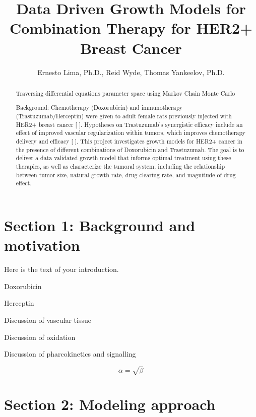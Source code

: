 \documentclass{article}
\begin{document}
\title{Data Driven Growth Models for Combination Therapy for HER2+ Breast Cancer}
\author{Ernesto Lima, Ph.D., Reid Wyde, Thomas Yankeelov, Ph.D.}

\maketitle

\begin{abstract}
Traversing differential equations parameter space using Markov Chain Monte Carlo

Background: Chemotherapy (Doxorubicin) and immunotherapy (Trastuzumab/Herceptin) were given to adult female rats previously injected with HER2+ breast cancer [ ]. Hypotheses on Trastuzumab's synergistic efficacy include an effect of improved vascular regularization within tumors, which improves chemotherapy delivery and efficacy [ ]. This project investigates growth models for HER2+ cancer in the presence of different combinations of Doxorubicin and Trastuzumab. The goal is to deliver a data validated growth model that informs optimal treatment using these therapies, as well as characterize the tumoral system, including the relationship between tumor size, natural growth rate, drug clearing rate, and magnitude of drug effect.

\end{abstract}

\section{Section 1: Background and motivation}
Here is the text of your introduction.

Doxorubicin


Herceptin


Discussion of vascular tissue

Discussion of oxidation

Discussion of pharcokinetics and signalling




\begin{equation}
    \label{simple_equation}
    \alpha = \sqrt{ \beta }
\end{equation}



\section{Section 2: Modeling approach}
\end{document}
